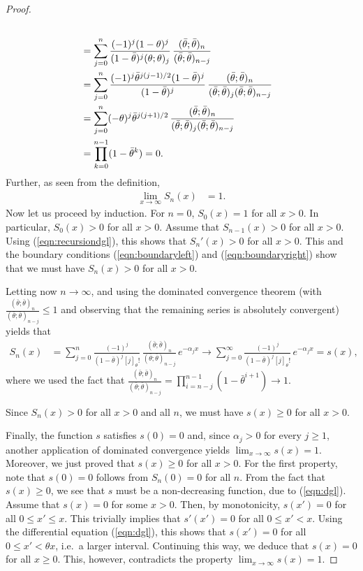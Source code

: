 \documentclass[12pt]{article}
\newcommand{\1}{\mathds{1}}
\theoremstyle{definition}
\theoremstyle{plain}
\theoremstyle{remark}
\begin{document}
\begin{proof}
\begin{align}
\\
&= \sum_{j=0}^n \frac{(-1)^j(1-\theta)^j}{ (1-\bar \theta)^j (\theta;\theta)_j}\,\frac{(\bar\theta;\bar\theta)_n}{(\bar\theta;\bar\theta)_{n-j}}\notag
\\
&= \sum_{j=0}^n \frac{(-1)^j\bar\theta^{j(j-1)/2}(1-\bar\theta)^j}{(1-\bar \theta)^j} \,\frac{ (\bar\theta;\bar\theta)_n}{(\bar\theta;\bar\theta)_j(\bar\theta;\bar\theta)_{n-j}}\notag
\\
 &= \sum_{j=0}^n (-\theta)^j \bar\theta^{j(j+1)/2} \,\frac{ (\bar\theta;\bar\theta)_n}{(\bar\theta;\bar\theta)_j(\bar\theta;\bar\theta)_{n-j}}\notag
\\
&=\prod_{k=0}^{n-1}(1-\bar\theta^k)
 =0. \label{eqn:boundaryleft}
\end{align}
Further, as seen from the definition,
\begin{align} \label{eqn:boundaryright}
\lim_{x\to\infty} S_n(x) & = 1.
\end{align}
Now let us proceed by induction. For $n=0$, $S_0(x)=1$ for all $x>0$. In particular, $S_0(x)>0$ for all $x>0$. 
Assume that $S_{n-1}(x)>0$ for all $x>0$. Using (\ref{eqn:recursiondgl}), this shows that $S_n'(x)>0$ for all $x>0$. This and the boundary conditions (\ref{eqn:boundaryleft}) and (\ref{eqn:boundaryright}) show that we must have $S_n(x)>0$ for all $x>0$. 

Letting now $n\to\infty$, and using the dominated convergence theorem (with $\frac{(\bar\theta;\bar\theta)_n}{(\bar\theta;\bar\theta)_{n-j}}\le 1$ and observing that the remaining series is absolutely convergent) yields that
\begin{align*}
S_n(x) & = \sum_{j=0}^n \frac{(-1)^j}{ (1-\bar \theta)^j [j]_\theta!}\,\frac{(\bar\theta;\bar\theta)_n}{(\bar\theta;\bar\theta)_{n-j}}\, e^{-\alpha_j x} \to \sum_{j=0}^\infty \frac{(-1)^j}{ (1-\bar \theta)^j [j]_\theta!}\, e^{-\alpha_j x} = s(x),
\end{align*}
where we used the fact that $\frac{(\bar\theta;\bar\theta)_n}{(\bar\theta;\bar\theta)_{n-j}}=\prod_{i=n-j}^{n-1}(1-\bar\theta^{i+1}) \to 1$.

Since $S_n(x)>0$ for all $x>0$ and all $n$, we must have $s(x)\geq 0$ for all $x>0$.

Finally, the function $s$ satisfies $s(0)=0$ and, since $\alpha_j>0$ for every $j\ge1$, another application of
dominated convergence yields $\lim_{x\to\infty} s(x) = 1$. Moreover, we just proved that $s(x)\geq 0$ for all $x>0$. For the first property, note that $s(0)=0$ follows from $S_n(0)=0$ for all $n$.
From the fact that $s(x)\geq 0$, we see that $s$ must be a non-decreasing function, due to (\ref{eqn:dgl}). Assume that $s(x)=0$ for some $x>0$. Then, by monotonicity, $s(x')=0$ for all $0\leq x'\leq x$. This trivially implies that $s'(x')=0$ for all $0\leq x'< x$. Using the differential equation (\ref{eqn:dgl}), this shows that $s(x')=0$ for all $0\leq x' < \theta x$, i.e.\ a larger interval. Continuing this way, we deduce that $s(x)=0$ for all $x\geq 0$. This, however, contradicts the property $\lim_{x\to\infty} s(x) = 1$.
\end{proof}
\end{document}
